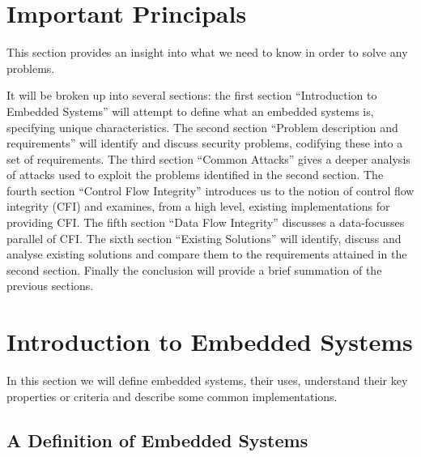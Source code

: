 \section{Important Principals}

This section provides an insight into what we need to know in order to solve any problems.

It will be broken up into several sections: the first section ``Introduction to Embedded Systems'' will attempt to define what an embedded systems is, specifying unique characteristics. The second section ``Problem description and requirements'' will identify and discuss security problems, codifying these into a set of requirements. The third section ``Common Attacks'' gives a deeper analysis of attacks used to exploit the problems identified in the second section. The fourth section ``Control Flow Integrity'' introduces us to the notion of control flow integrity (CFI) and examines, from a high level, existing implementations for providing CFI. The fifth section ``Data Flow Integrity'' discusses a data-focusses parallel of CFI. The sixth section ``Existing Solutions'' will identify, discuss and analyse existing solutions and compare them to the requirements attained in the second section. Finally the conclusion will provide a brief summation of the previous sections.

\section{Introduction to Embedded Systems}

In this section we will define embedded systems, their uses, understand their key properties or criteria and describe some common implementations.


\subsection{A Definition of Embedded Systems}

